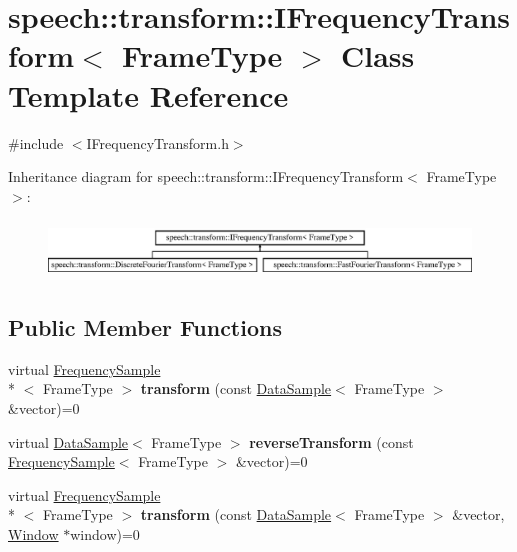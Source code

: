 \hypertarget{classspeech_1_1transform_1_1IFrequencyTransform}{\section{speech\+:\+:transform\+:\+:I\+Frequency\+Transform$<$ Frame\+Type $>$ Class Template Reference}
\label{classspeech_1_1transform_1_1IFrequencyTransform}
}


{\ttfamily \#include $<$I\+Frequency\+Transform.\+h$>$}

Inheritance diagram for speech\+:\+:transform\+:\+:I\+Frequency\+Transform$<$ Frame\+Type $>$\+:\begin{figure}[H]
\begin{center}
\leavevmode
\includegraphics[height=1.555556cm]{classspeech_1_1transform_1_1IFrequencyTransform}
\end{center}
\end{figure}
\subsection*{Public Member Functions}
\begin{DoxyCompactItemize}
\item 
\hypertarget{classspeech_1_1transform_1_1IFrequencyTransform_a2012eb643e7888e08658dccc4f11b206}{virtual \hyperlink{classspeech_1_1raw__data_1_1FrequencySample}{Frequency\+Sample}\\*
$<$ Frame\+Type $>$ {\bfseries transform} (const \hyperlink{classspeech_1_1raw__data_1_1DataSample}{Data\+Sample}$<$ Frame\+Type $>$ \&vector)=0}\label{classspeech_1_1transform_1_1IFrequencyTransform_a2012eb643e7888e08658dccc4f11b206}

\item 
\hypertarget{classspeech_1_1transform_1_1IFrequencyTransform_a2882e1cad03d0a7e6ec373c10ae1ef81}{virtual \hyperlink{classspeech_1_1raw__data_1_1DataSample}{Data\+Sample}$<$ Frame\+Type $>$ {\bfseries reverse\+Transform} (const \hyperlink{classspeech_1_1raw__data_1_1FrequencySample}{Frequency\+Sample}$<$ Frame\+Type $>$ \&vector)=0}\label{classspeech_1_1transform_1_1IFrequencyTransform_a2882e1cad03d0a7e6ec373c10ae1ef81}

\item 
\hypertarget{classspeech_1_1transform_1_1IFrequencyTransform_a3b4f5614232cb3d34c6319304ba93829}{virtual \hyperlink{classspeech_1_1raw__data_1_1FrequencySample}{Frequency\+Sample}\\*
$<$ Frame\+Type $>$ {\bfseries transform} (const \hyperlink{classspeech_1_1raw__data_1_1DataSample}{Data\+Sample}$<$ Frame\+Type $>$ \&vector, \hyperlink{classspeech_1_1transform_1_1window_1_1Window}{Window} $\ast$window)=0}\label{classspeech_1_1transform_1_1IFrequencyTransform_a3b4f5614232cb3d34c6319304ba93829}

\end{DoxyCompactItemize}


